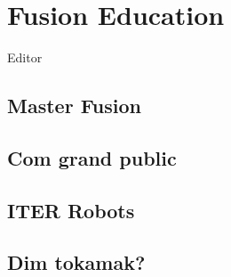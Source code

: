 \setchapterpreamble[u]{
	\dictum[R. P. Feynman] %
	{What one fool could understand, another can.}
	\margintoc
}

\chapter{Fusion Education}
Editor 


\section{Master Fusion}
\section{Com grand public}
\section{ITER Robots}
\section{Dim tokamak?}